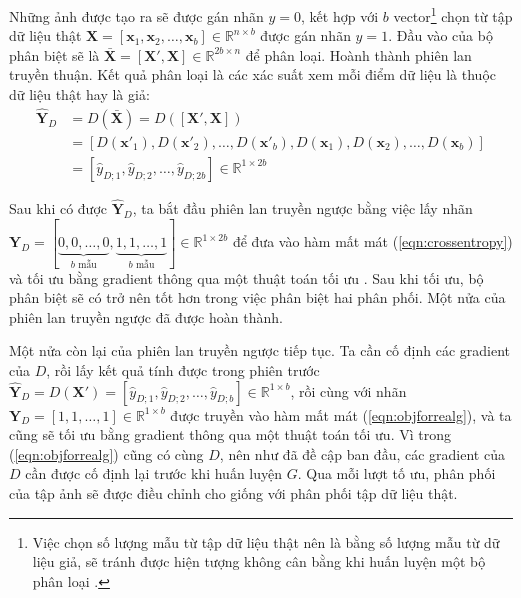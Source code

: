 \documentclass[a4paper, 12pt]{report}
\begin{document}
Những ảnh được tạo ra sẽ được gán nhãn $y=0$, kết hợp với $b$ vector\footnote{Việc chọn số lượng mẫu từ tập dữ liệu thật nên là bằng số lượng mẫu từ dữ liệu giả, sẽ tránh được hiện tượng không cân bằng khi huấn luyện một bộ phân loại \cite{jasonimbalance2019}.} chọn từ tập dữ liệu thật $\mathbf{X} = \left[\mathbf{x}_1, \mathbf{x}_2, \dots, \mathbf{x}_b\right] \in \mathbb{R}^{n \times b}$ được gán nhãn $y=1$.
Đầu vào của bộ phân biệt sẽ là $\mathbf{\bar{X}} = \left[\mathbf{X'}, \mathbf{X}\right] \in \mathbb{R}^{2b \times n}$ để phân loại.
Hoành thành phiên lan truyền thuận.
Kết quả phân loại là các xác suất xem mỗi điểm dữ liệu là thuộc dữ liệu thật hay là giả:
\begin{align}
    \widehat{\mathbf{Y}}_D &= D\left(\mathbf{\bar{X}}\right) = D\left(\left[\mathbf{X'}, \mathbf{X}\right]\right)\nonumber\\
                &= \left[D\left(\mathbf{x'}_1\right), D\left(\mathbf{x'}_2\right), \dots, D\left(\mathbf{x'}_b\right), D\left(\mathbf{x}_1\right), D\left(\mathbf{x}_2\right), \dots, D\left(\mathbf{x}_b\right)\right]\nonumber\\
                &= \left[\widehat{y}_{D; 1}, \widehat{y}_{D; 2}, \dots, \widehat{y}_{D; 2b}\right] \in \mathbb{R}^{1 \times 2b}
\end{align}

Sau khi có được $\widehat{\mathbf{Y}}_D$, ta bắt đầu phiên lan truyền ngược bằng việc lấy nhãn $\mathbf{Y}_D=[\underbrace{0, 0, \dots, 0}_{b \text{ mẫu}}, \underbrace{1, 1, \dots, 1}_{b \text{ mẫu}}] \in \mathbb{R}^{1 \times 2b}$ để đưa vào hàm mất mát (\ref{eqn:crossentropy}) và tối ưu bằng gradient thông qua một thuật toán tối ưu \cite{ruder2017overview}.
Sau khi tối ưu, bộ phân biệt sẽ có trở nên tốt hơn trong việc phân biệt hai phân phối.
Một nửa của phiên lan truyền ngược đã được hoàn thành.\vspace{5pt}

Một nửa còn lại của phiên lan truyền ngược tiếp tục.
Ta cần cố định các gradient của $D$, rồi lấy kết quả tính được trong phiên trước $\widehat{\mathbf{Y}}_D = D\left(\mathbf{X'}\right) = \left[\widehat{y}_{D; 1}, \widehat{y}_{D; 2}, \dots, \widehat{y}_{D; b}\right] \in \mathbb{R}^{1 \times b}$, rồi cùng với nhãn $\mathbf{Y}_D=\left[1, 1, \dots, 1\right] \in \mathbb{R}^{1 \times b}$ được truyền vào hàm mất mát (\ref{eqn:objforrealg}), và ta cũng sẽ tối ưu bằng gradient thông qua một thuật toán tối ưu.
Vì trong (\ref{eqn:objforrealg}) cũng có cùng $D$, nên như đã đề cập ban đầu, các gradient của $D$ cần được cố định lại trước khi huấn luyện $G$.
Qua mỗi lượt tố ưu, phân phối của tập ảnh sẽ được điều chỉnh cho giống với phân phối tập dữ liệu thật.\vspace{5pt}
\end{document}
